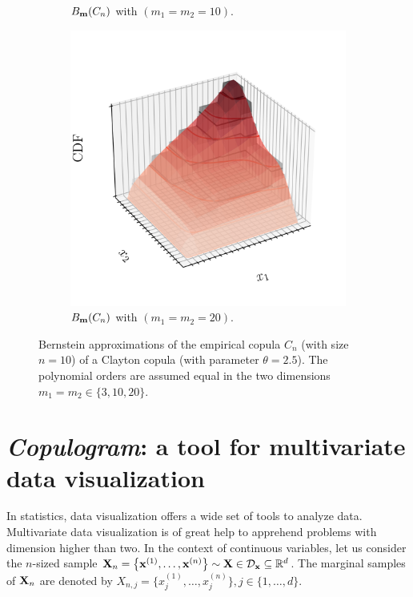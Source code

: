 \begin{figure}
\begin{subfigure}[b]{0.49\textwidth}
        \caption{$B_{{\bf m}}(C_n)$ with $(m_1=m_2=10)$.}
    \end{subfigure}
    \begin{subfigure}[b]{0.49\textwidth}
        \centering
        \includegraphics[width=\linewidth]{../numerical_experiments/chapter3/figures/ebc_m20.png}
        \caption{$B_{{\bf m}}(C_n)$ with $(m_1=m_2=20)$.}
    \end{subfigure}
    \centering
    \caption{Bernstein approximations of the empirical copula $C_n$ (with size $n=10$) of a Clayton copula (with parameter $\theta=2.5$). The polynomial orders are assumed equal in the two dimensions $m_1=m_2\in\{3, 10, 20\}$.}
    \label{fig:ebc_illustration}
\end{figure}

\newpage
\section{\textit{Copulogram}: a tool for multivariate data visualization}\label{sec:copulogram}
In statistics, data visualization offers a wide set of tools to analyze data. 
Multivariate data visualization is of great help to apprehend problems with dimension higher than two. 
In the context of continuous variables, let us consider the $n$-sized sample ${\bf X}_n = \left\{{\bf x}^{(1)}, \dots, {\bf x}^{(n)}\right\} \sim {\bf X} \in \mathcal{D}_{{\bf x}}\subseteq\mathbb{R}^d$. 
The marginal samples of ${\bf X}_n$ are denoted by $X_{n, j} = \{x_j^{(1)}, \dots, x_j^{(n)}\}, j\in \{1, \dots, d\}$.


